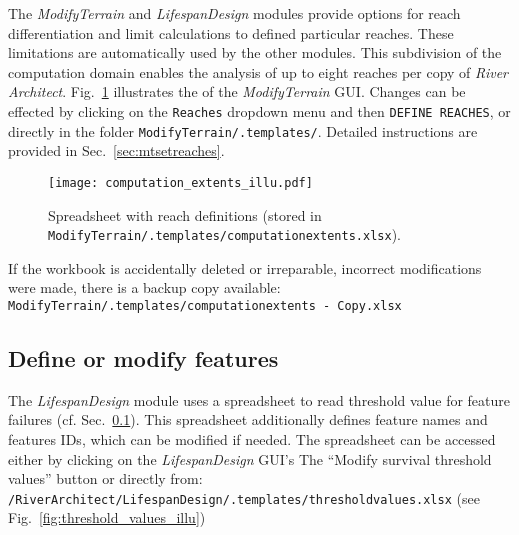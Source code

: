 The \textit{ModifyTerrain} and \textit{LifespanDesign} modules provide options for reach differentiation and limit calculations to defined particular reaches. These limitations are automatically used by the other modules. This subdivision of the computation domain enables the analysis of up to eight reaches per copy of \textit{River Architect}. Fig.~\ref{fig:illu_reaches} illustrates the  of the \textit{ModifyTerrain} GUI. Changes can be effected by clicking on the \texttt{Reaches} dropdown menu and then \texttt{DEFINE REACHES}, or directly in the folder \texttt{ModifyTerrain/.templates/}. Detailed instructions are provided in Sec.~\ref{sec:mtsetreaches}.

\begin{figure}[hbt]
	\begin{center}
	\texttt{[image: computation\_extents\_illu.pdf]} %
	\caption{Spreadsheet with reach definitions (stored in \texttt{ModifyTerrain/.templates/computation{\myUnderscore}extents.xlsx}). \label{fig:illu_reaches}}
	\end{center}
\end{figure}

If the workbook is accidentally deleted or irreparable, incorrect modifications were made, there is a backup copy available:\\
\texttt{ModifyTerrain/.templates/computation{\myUnderscore}extents - Copy.xlsx}

\subsection{Define or modify features} \label{sec:modfeat}
The \textit{LifespanDesign} module uses a spreadsheet to read threshold value for feature failures (cf. Sec.~\ref{sec:modfeat}). This spreadsheet additionally defines feature names and features IDs, which can be modified if needed. The spreadsheet can be accessed either by clicking on the \textit{LifespanDesign} GUI's The ``Modify survival threshold values'' button or directly from:\\
\texttt{/RiverArchitect/LifespanDesign/.templates/threshold{\myUnderscore}values.xlsx} (see Fig.~\ref{fig:threshold_values_illu})\\

